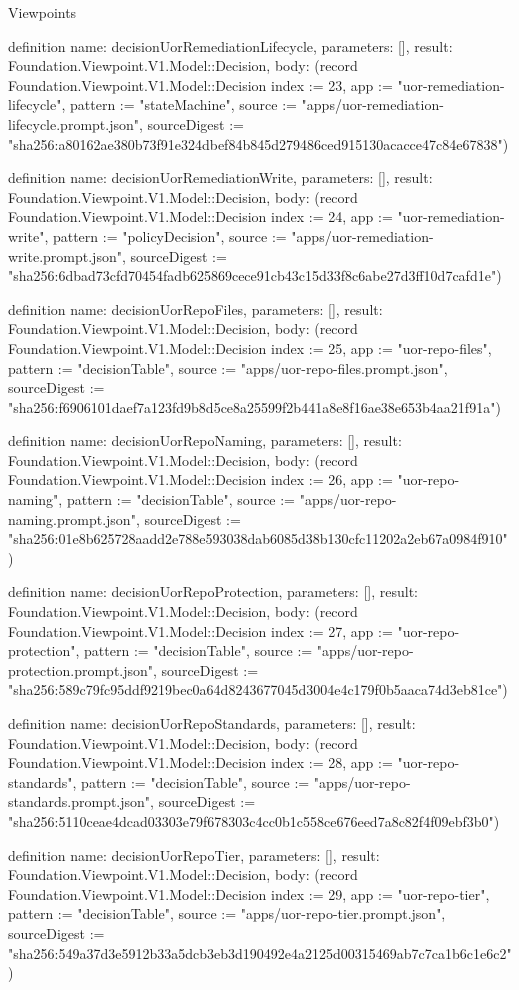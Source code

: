 \begin{lexlean}{Viewpoints}
\begin{semanticmodule}
definition{
  name: decisionUorRemediationLifecycle,
  parameters: [],
  result: Foundation.Viewpoint.V1.Model::Decision,
  body: (record Foundation.Viewpoint.V1.Model::Decision {index := 23, app := "uor-remediation-lifecycle", pattern := "stateMachine", source := "apps/uor-remediation-lifecycle.prompt.json", sourceDigest := "sha256:a80162ae380b73f91e324dbef84b845d279486ced915130acacce47c84e67838"})
}

definition{
  name: decisionUorRemediationWrite,
  parameters: [],
  result: Foundation.Viewpoint.V1.Model::Decision,
  body: (record Foundation.Viewpoint.V1.Model::Decision {index := 24, app := "uor-remediation-write", pattern := "policyDecision", source := "apps/uor-remediation-write.prompt.json", sourceDigest := "sha256:6dbad73cfd70454fadb625869cece91cb43c15d33f8c6abe27d3ff10d7cafd1e"})
}

definition{
  name: decisionUorRepoFiles,
  parameters: [],
  result: Foundation.Viewpoint.V1.Model::Decision,
  body: (record Foundation.Viewpoint.V1.Model::Decision {index := 25, app := "uor-repo-files", pattern := "decisionTable", source := "apps/uor-repo-files.prompt.json", sourceDigest := "sha256:f6906101daef7a123fd9b8d5ce8a25599f2b441a8e8f16ae38e653b4aa21f91a"})
}

definition{
  name: decisionUorRepoNaming,
  parameters: [],
  result: Foundation.Viewpoint.V1.Model::Decision,
  body: (record Foundation.Viewpoint.V1.Model::Decision {index := 26, app := "uor-repo-naming", pattern := "decisionTable", source := "apps/uor-repo-naming.prompt.json", sourceDigest := "sha256:01e8b625728aadd2e788e593038dab6085d38b130cfc11202a2eb67a0984f910"})
}

definition{
  name: decisionUorRepoProtection,
  parameters: [],
  result: Foundation.Viewpoint.V1.Model::Decision,
  body: (record Foundation.Viewpoint.V1.Model::Decision {index := 27, app := "uor-repo-protection", pattern := "decisionTable", source := "apps/uor-repo-protection.prompt.json", sourceDigest := "sha256:589c79fc95ddf9219bec0a64d8243677045d3004e4c179f0b5aaca74d3eb81ce"})
}

definition{
  name: decisionUorRepoStandards,
  parameters: [],
  result: Foundation.Viewpoint.V1.Model::Decision,
  body: (record Foundation.Viewpoint.V1.Model::Decision {index := 28, app := "uor-repo-standards", pattern := "decisionTable", source := "apps/uor-repo-standards.prompt.json", sourceDigest := "sha256:5110ceae4dcad03303e79f678303c4cc0b1c558ce676eed7a8c82f4f09ebf3b0"})
}

definition{
  name: decisionUorRepoTier,
  parameters: [],
  result: Foundation.Viewpoint.V1.Model::Decision,
  body: (record Foundation.Viewpoint.V1.Model::Decision {index := 29, app := "uor-repo-tier", pattern := "decisionTable", source := "apps/uor-repo-tier.prompt.json", sourceDigest := "sha256:549a37d3e5912b33a5dcb3eb3d190492e4a2125d00315469ab7c7ca1b6c1e6c2"})
}


\end{semanticmodule}
\end{lexlean}
